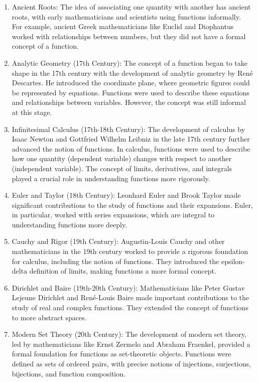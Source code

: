 \documentclass{article}
\begin{document}
\begin{enumerate}
  \item Ancient Roots: The idea of associating one quantity with another has ancient roots, with early mathematicians and scientists using functions informally. For example, ancient Greek mathematicians like Euclid and Diophantus worked with relationships between numbers, but they did not have a formal concept of a function.
  \item Analytic Geometry (17th Century): The concept of a function began to take shape in the 17th century with the development of analytic geometry by René Descartes. He introduced the coordinate plane, where geometric figures could be represented by equations. Functions were used to describe these equations and relationships between variables. However, the concept was still informal at this stage.
  \item Infinitesimal Calculus (17th-18th Century): The development of calculus by Isaac Newton and Gottfried Wilhelm Leibniz in the late 17th century further advanced the notion of functions. In calculus, functions were used to describe how one quantity (dependent variable) changes with respect to another (independent variable). The concept of limits, derivatives, and integrals played a crucial role in understanding functions more rigorously.
  \item Euler and Taylor (18th Century): Leonhard Euler and Brook Taylor made significant contributions to the study of functions and their expansions. Euler, in particular, worked with series expansions, which are integral to understanding functions more deeply.
  \item Cauchy and Rigor (19th Century): Augustin-Louis Cauchy and other mathematicians in the 19th century worked to provide a rigorous foundation for calculus, including the notion of functions. They introduced the epsilon-delta definition of limits, making functions a more formal concept.
  \item Dirichlet and Baire (19th-20th Century): Mathematicians like Peter Gustav Lejeune Dirichlet and René-Louis Baire made important contributions to the study of real and complex functions. They extended the concept of functions to more abstract spaces.
  \item Modern Set Theory (20th Century): The development of modern set theory, led by mathematicians like Ernst Zermelo and Abraham Fraenkel, provided a formal foundation for functions as set-theoretic objects. Functions were defined as sets of ordered pairs, with precise notions of injections, surjections, bijections, and function composition.

\end{enumerate}
\end{document}

